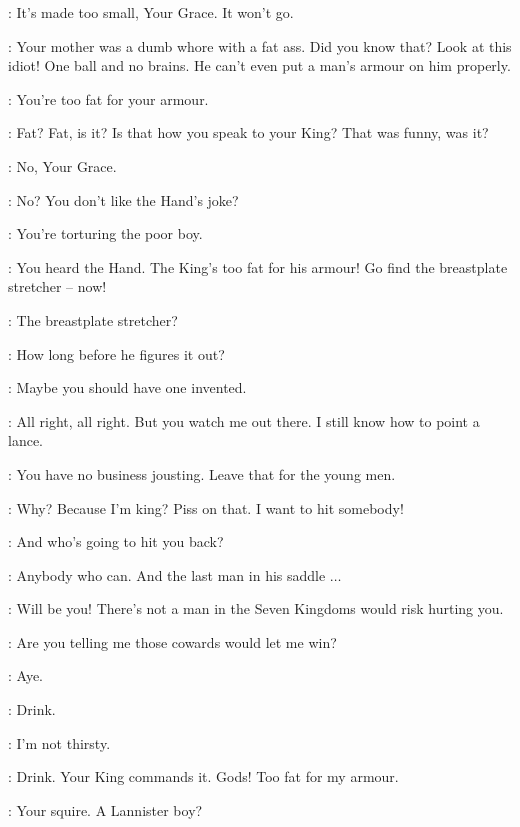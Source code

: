 
\LANCEL: It's made too small, Your Grace. It won't go. 

\ROBERT: Your mother was a dumb whore with a fat ass. Did you know that? Look at this idiot! One ball and no brains. He can't even put a man's armour on him properly. 

\NED: You're too fat for your armour. 

\ROBERT: Fat? Fat, is it? Is that how you speak to your King?  That was funny, was it? 

\LANCEL: No, Your Grace. 

\ROBERT: No? You don't like the Hand's joke? 

\NED: You're torturing the poor boy. 

\ROBERT: You heard the Hand. The King's too fat for his armour! Go find the breastplate stretcher -- now! 


\NED: The breastplate stretcher? 

\ROBERT: How long before he figures it out? 

\NED: Maybe you should have one invented. 

\ROBERT: All right, all right. But you watch me out there. I still know how to point a lance. 

\NED: You have no business jousting. Leave that for the young men. 

\ROBERT: Why? Because I'm king? Piss on that. I want to hit somebody! 

\NED: And who's going to hit you back? 

\ROBERT: Anybody who can. And the last man in his saddle $\dots$

\NED: Will be you! There's not a man in the Seven Kingdoms would risk hurting you. 

\ROBERT: Are you telling me those cowards would let me win? 

\NED: Aye. 


\ROBERT:  Drink. 

\NED: I'm not thirsty. 

\ROBERT: Drink. Your King commands it. Gods! Too fat for my armour. 

\NED: Your squire. A Lannister boy? 

